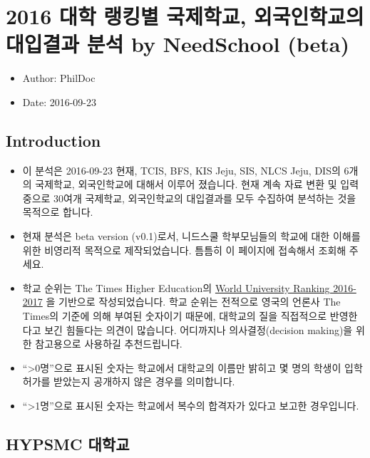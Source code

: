 \documentclass[13pt,]{article}
\title{}
\author{}
\date{}
\providecommand{\tightlist}{%
  \setlength{\itemsep}{0pt}\setlength{\parskip}{0pt}}
\begin{document}
{
\setcounter{tocdepth}{2}
\tableofcontents
}
\section{2016 대학 랭킹별 국제학교, 외국인학교의 대입결과 분석 by
NeedSchool (beta)}\label{------by-needschool-beta}

\begin{itemize}
\tightlist
\item
  Author: PhilDoc
\item
  Date: 2016-09-23
\end{itemize}

\subsection{Introduction}\label{introduction}

\begin{itemize}
\tightlist
\item
  이 분석은 2016-09-23 현재, TCIS, BFS, KIS Jeju, SIS, NLCS Jeju, DIS의
  6개의 국제학교, 외국인학교에 대해서 이루어 졌습니다. 현재 계속 자료
  변환 및 입력중으로 30여개 국제학교, 외국인학교의 대입결과를 모두
  수집하여 분석하는 것을 목적으로 합니다.
\item
  현재 분석은 beta version (v0.1)로서, 니드스쿨 학부모님들의 학교에 대한
  이해를 위한 비영리적 목적으로 제작되었습니다. 틈틈히 이 페이지에
  접속해서 조회해 주세요.
\item
  학교 순위는 The Times Higher Education의
  \href{https://www.timeshighereducation.com/world-university-rankings/2017/world-ranking}{World
  University Ranking 2016-2017} 을 기반으로 작성되었습니다. 학교 순위는
  전적으로 영국의 언론사 The Times의 기준에 의해 부여된 숫자이기 때문에,
  대학교의 질을 직접적으로 반영한다고 보긴 힘들다는 의견이 많습니다.
  어디까지나 의사결정(decision making)을 위한 참고용으로 사용하길
  추천드립니다.
\item
  ``\textgreater{}0명''으로 표시된 숫자는 학교에서 대학교의 이름만
  밝히고 몇 명의 학생이 입학허가를 받았는지 공개하지 않은 경우를
  의미합니다.
\item
  ``\textgreater{}1명''으로 표시된 숫자는 학교에서 복수의 합격자가
  있다고 보고한 경우입니다.
\end{itemize}

\subsection{HYPSMC 대학교}\label{hypsmc-}
\end{document}

